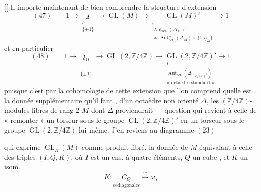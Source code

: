 \documentclass[11pt,a4paper]{article}
\begin{document}
$[\![$ Il importe maintenant de bien comprendre la structure d'extension
\[
  (47) \qquad 1 \to \underset{\substack{\wr\\ \{\pm 1\}}}{\mathfrak{z}} \longrightarrow \operatorname{GL}(M) \longrightarrow \underset{\substack{\wr\\ \operatorname{Aut}_{\mathrm{oct}}(\Delta_M)'\\ \simeq \operatorname{Aut}^+_{\mathrm{oct}}(\Delta_M) \times \{1, \underline{a}_\Delta\}}}{\operatorname{GL}(M)'} \longrightarrow 1
\]
et en particulier
\[
  (48) \qquad 1 \to \underset{\substack{\|\\ \{\pm 1\}}}{\mathfrak{z}_0} \longrightarrow \operatorname{GL}(2, \mathbb{Z}/4\mathbb{Z}) \longrightarrow \underset{\substack{\wr\\ \operatorname{Aut}_{\mathrm{oct}}(\Delta_{(\mathbb{Z}/4\mathbb{Z})^2})\\ \text{« octaèdre standard »}}}{\operatorname{GL}(2, \mathbb{Z}/4\mathbb{Z})'} \longrightarrow 1
\]
puisque c'est par la cohomologie de cette extension que l'on comprend quelle est la donnée supplémentaire qu'il faut , d'un octaèdre non orienté $\Delta$, les $(\mathbb{Z}/4\mathbb{Z})$-modules libres de rang $2$ $M$ dont $\Delta$ proviendrait --- question qui revient à celle de « remonter » un torseur sous le groupe $\operatorname{GL}(2, \mathbb{Z}/4\mathbb{Z})'$ en un torseur sous le groupe $\operatorname{GL}(2, \mathbb{Z}/4\mathbb{Z})$ lui-même.
J'en reviens au diagramme $(23)$


qui exprime $\operatorname{GL}_\Lambda(M)$ comme produit fibré, la donnée de $M$ équivalant à celle des triples $(I, Q, K)$, où $I$ est un ens. à quatre éléments, $Q$ un cube , et $K$ un isom.
\[
  K : \underset{\text{codiagonales}}{C_Q} \xrightarrow{\;\sim\;} \underline{\omega}_I
\]
\end{document}
